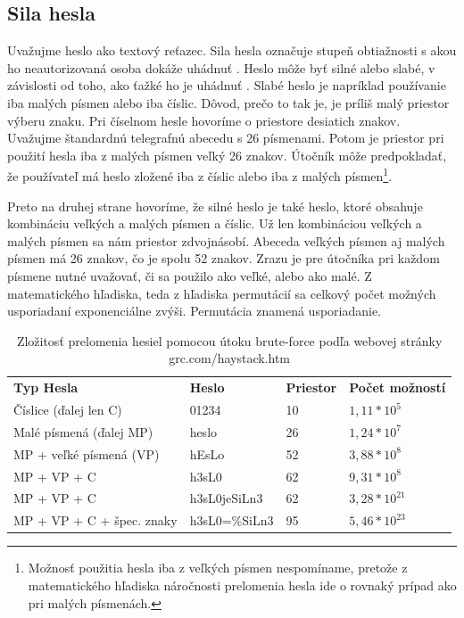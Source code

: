 \subsection{Sila hesla} 
Uvažujme heslo ako textový reťazec. Sila hesla označuje stupeň obtiažnosti s akou ho neautorizovaná osoba dokáže uhádnuť \cite{4}. Heslo môže byť silné alebo slabé, v závislosti od toho, ako ťažké ho je uhádnuť \cite{4}. Slabé heslo je napríklad používanie iba malých písmen alebo iba číslic. Dôvod, prečo to tak je, je príliš malý priestor výberu znaku. Pri číselnom hesle hovoríme o priestore desiatich znakov. Uvažujme štandardnú telegrafnú abecedu s 26 písmenami. Potom je priestor pri použití hesla iba z malých písmen veľký 26 znakov. Útočník môže predpokladať, že používateľ má heslo zložené iba z číslic alebo iba z malých písmen\footnote{Možnosť použitia hesla iba z veľkých písmen nespomíname, pretože z matematického hľadiska náročnosti prelomenia hesla ide o rovnaký prípad ako pri malých písmenách.}. \par Preto na druhej strane hovoríme, že silné heslo je také heslo, ktoré obsahuje kombináciu veľkých a malých písmen a číslic. Už len kombináciou veľkých a malých písmen sa nám priestor zdvojnásobí. Abeceda veľkých písmen aj malých písmen má 26 znakov, čo je spolu 52 znakov. Zrazu je pre útočníka pri každom písmene nutné uvažovať, či sa použilo ako veľké, alebo ako malé. Z matematického hľadiska, teda z hľadiska permutácií sa celkový počet možných usporiadaní exponenciálne zvýši. Permutácia znamená usporiadanie.  


\begin{table}[ht]
\caption{Zložitosť prelomenia hesiel pomocou útoku brute-force podľa webovej stránky grc.com/haystack.htm}
\label{table:1}
\begin{tabular}{llll}
\textbf{Typ Hesla}        & \textbf{Heslo} & \textbf{Priestor} & \textbf{Počet možností} \\
Číslice (ďalej len C)     & 01234          & 10                & $1,11*10^5$             \\
Malé písmená (ďalej MP)   & heslo          & 26                & $1,24*10^7$             \\
MP + veľké písmená (VP)   & hEsLo          & 52                & $3,88*10^8$             \\
MP + VP + C               & h3sL0          & 62                & $9,31*10^8$             \\
MP + VP + C				  & h3sL0jeSiLn3   & 62				   & $3,28*10^{21}$			 \\
MP + VP + C + špec. znaky & h3sL0=\%SiLn3  & 95                & $5,46*10^{23}$           
\end{tabular}
\end{table}

